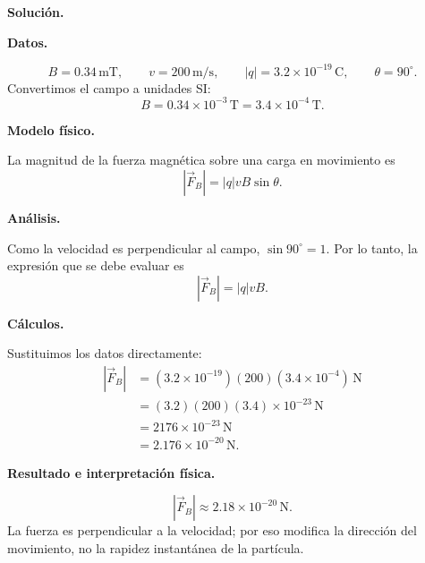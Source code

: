 \documentclass[11pt]{article}
\newcommand{\soluciontitulo}{%
  \par\medskip
  \noindent\textbf{Solución.}\par
  \smallskip
}
\begin{document}
\soluciontitulo

\par\medskip\noindent\textbf{Datos.}\par\smallskip
\begin{equation*}
    B=0.34\,\mathrm{mT},
    \qquad
    v=200\,\mathrm{m/s},
    \qquad
    |q|=3.2\times10^{-19}\,\mathrm C,
    \qquad
    \theta=90^\circ.
\end{equation*}
Convertimos el campo a unidades SI:
\begin{equation*}
    B=0.34\times10^{-3}\,\mathrm T=3.4\times10^{-4}\,\mathrm T.
\end{equation*}

\par\medskip\noindent\textbf{Modelo físico.}\par\smallskip
La magnitud de la fuerza magn\'etica sobre una carga en movimiento es
\begin{equation*}
    |\vec F_B|=|q|vB\sin\theta.
\end{equation*}

\par\medskip\noindent\textbf{Análisis.}\par\smallskip
Como la velocidad es perpendicular al campo, $\sin90^\circ=1$. Por lo tanto, la expresi\'on que se debe evaluar es
\begin{equation*}
    |\vec F_B|=|q|vB.
\end{equation*}

\par\medskip\noindent\textbf{Cálculos.}\par\smallskip
Sustituimos los datos directamente:
\begin{align*}
    |\vec F_B|
    &=(3.2\times10^{-19})(200)(3.4\times10^{-4})\,\mathrm N\\
    &=(3.2)(200)(3.4)\times10^{-23}\,\mathrm N\\
    &=2176\times10^{-23}\,\mathrm N\\
    &=2.176\times10^{-20}\,\mathrm N.
\end{align*}

\par\medskip\noindent\textbf{Resultado e interpretación física.}\par\smallskip
\begin{equation*}
    \boxed{|\vec F_B|\approx2.18\times10^{-20}\,\mathrm N}.
\end{equation*}
La fuerza es perpendicular a la velocidad; por eso modifica la direcci\'on del movimiento, no la rapidez instant\'anea de la part\'icula.
\end{document}
